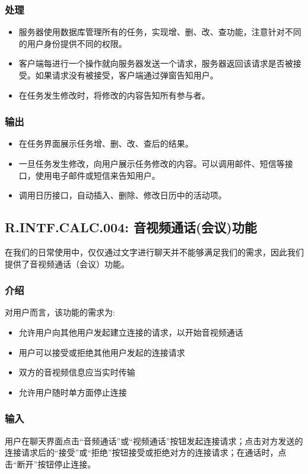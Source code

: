 \subsubsection{处理}
\begin{itemize}
  \item 服务器使用数据库管理所有的任务，实现增、删、改、查功能，注意针对不同的用户身份提供不同的权限。
  \item 客户端每进行一个操作就向服务器发送一个请求，服务器返回该请求是否被接受。如果请求没有被接受，客户端通过弹窗告知用户。
  \item 在任务发生修改时，将修改的内容告知所有参与者。
\end{itemize}
\subsubsection{输出}
\begin{itemize}
  \item 在任务界面展示任务增、删、改、查后的结果。
  \item 一旦任务发生修改，向用户展示任务修改的内容。可以调用邮件、短信等接口，使用电子邮件或短信来告知用户。
  \item 调用日历接口，自动插入、删除、修改日历中的活动项。
\end{itemize}

\subsection{R.INTF.CALC.004: 音视频通话(会议)功能}
在我们的日常使用中，仅仅通过文字进行聊天并不能够满足我们的需求，因此我们提供了音视频通话（会议）功能。
\subsubsection{介绍}
对用户而言，该功能的需求为:
\begin{itemize}
  \item 允许用户向其他用户发起建立连接的请求，以开始音视频通话
  \item 用户可以接受或拒绝其他用户发起的连接请求
  \item 双方的音视频信息应当实时传输
  \item 允许用户随时单方面停止连接
\end{itemize}
\subsubsection{输入}
用户在聊天界面点击“音频通话”或“视频通话”按钮发起连接请求；点击对方发送的连接请求后的“接受”或“拒绝”按钮接受或拒绝对方的连接请求；在通话时，点击“断开”按钮停止连接。
